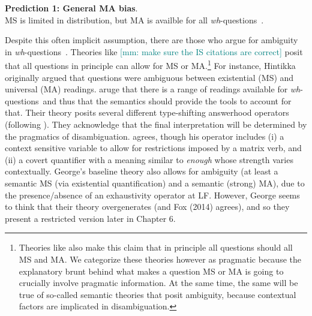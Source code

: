\documentclass[12pt,letterpaper,table,svgnames,dvipsnames]{article}
\newcommand{\mm}[1]{\textcolor{teal}{[mm: #1]}}
\newcommand{\whqs}{\emph{wh}-questions~}
\begin{document}
\begin{tcolorbox}[colback=white]
\noindent \textbf{Prediction 1: General MA bias}. \\
MS is limited in distribution, but MA is availble for all \whqs.
\end{tcolorbox}


Despite this often implicit assumption, there are those who argue for ambiguity in \whqs. Theories like  \mm{make sure the IS citations are correct} \cite{ciardelliroelthei,ciargroroel,theiler2014,theiroealo2016} posit that all questions in principle can allow for MS or MA.\footnote{Theories like \cite{ginzburg1995,asherlascarides1998,vanrooij2003,vanrooij2004} also make this claim that in principle all questions should all MS and MA. We categorize these theories however as pragmatic because the explanatory brunt behind what makes a question MS or MA is going to crucially involve pragmatic information. At the same time, the same will be true of so-called semantic theories that posit ambiguity, because contextual factors are implicated in disambiguation.} For instance, Hintikka originally argued that questions were ambiguous between existential (MS) and universal (MA) readings.  aruge that there is a range of readings available for \whqs and thus that the semantics should provide the tools to account for that. Their theory posits several different type-shifting answerhood operators (following \cite{heim1994}). They acknowledge that the final interpretation will be determined by the pragmatics of disambiguation.  agrees, though his operator includes (i) a context sensitive variable to allow for restrictions imposed by a matrix verb, and (ii) a covert quantifier with a meaning similar to \emph{enough} whose strength varies contextually. George's baseline theory also allows for ambiguity (at least a semantic MS (via existential quantification) and a semantic (strong) MA), due to the presence/absence of an exhaustivity operator at LF. However, George seems to think that their theory overgenerates (and Fox (2014) agrees), and so they present a restricted version later in Chapter 6.
\end{document}
